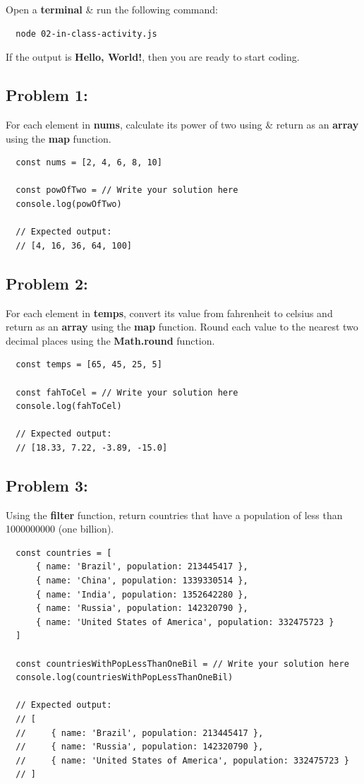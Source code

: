 \documentclass{article}
\begin{document}
Open a \textbf{terminal} \& run the following command:

\begin{verbatim}
  node 02-in-class-activity.js
\end{verbatim}

If the output is \textbf{Hello, World!}, then you are ready to start coding.

\subsection*{Problem 1:}
For each element in \textbf{nums}, calculate its power of two using \& return as an \textbf{array} using the \textbf{map} function.

\begin{verbatim}
  const nums = [2, 4, 6, 8, 10]

  const powOfTwo = // Write your solution here
  console.log(powOfTwo)

  // Expected output:
  // [4, 16, 36, 64, 100]
\end{verbatim}

\subsection*{Problem 2:}
For each element in \textbf{temps}, convert its value from fahrenheit to celsius and return as an \textbf{array} using the \textbf{map} function. Round each value to the nearest two decimal places using the \textbf{Math.round} function.

\begin{verbatim}
  const temps = [65, 45, 25, 5]

  const fahToCel = // Write your solution here
  console.log(fahToCel)

  // Expected output:
  // [18.33, 7.22, -3.89, -15.0]
\end{verbatim}

\subsection*{Problem 3:}
Using the \textbf{filter} function, return countries that have a population of less than 1000000000 (one billion).

\begin{verbatim}
  const countries = [
      { name: 'Brazil', population: 213445417 },
      { name: 'China', population: 1339330514 },
      { name: 'India', population: 1352642280 },
      { name: 'Russia', population: 142320790 },
      { name: 'United States of America', population: 332475723 }
  ]

  const countriesWithPopLessThanOneBil = // Write your solution here
  console.log(countriesWithPopLessThanOneBil)

  // Expected output:
  // [
  //     { name: 'Brazil', population: 213445417 }, 
  //     { name: 'Russia', population: 142320790 }, 
  //     { name: 'United States of America', population: 332475723 }
  // ]
\end{verbatim}
\end{document}
